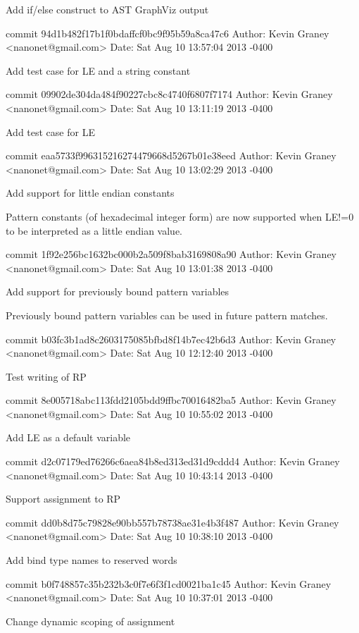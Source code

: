     Add if/else construct to AST GraphViz output

commit 94d1b482f17b1f0bdaffcf0bc9f95b59a8ca47c6
Author: Kevin Graney <nanonet@gmail.com>
Date:   Sat Aug 10 13:57:04 2013 -0400

    Add test case for LE and a string constant

commit 09902de304da484f90227cbc8c4740f6807f7174
Author: Kevin Graney <nanonet@gmail.com>
Date:   Sat Aug 10 13:11:19 2013 -0400

    Add test case for LE

commit eaa5733f996315216274479668d5267b01e38eed
Author: Kevin Graney <nanonet@gmail.com>
Date:   Sat Aug 10 13:02:29 2013 -0400

    Add support for little endian constants
    
    Pattern constants (of hexadecimal integer form) are now supported
    when LE!=0 to be interpreted as a little endian value.

commit 1f92e256bc1632bc000b2a509f8bab3169808a90
Author: Kevin Graney <nanonet@gmail.com>
Date:   Sat Aug 10 13:01:38 2013 -0400

    Add support for previously bound pattern variables
    
    Previously bound pattern variables can be used in future pattern
    matches.

commit b03fc3b1ad8c2603175085bfbd8f14b7ec42b6d3
Author: Kevin Graney <nanonet@gmail.com>
Date:   Sat Aug 10 12:12:40 2013 -0400

    Test writing of RP

commit 8e005718abc113fdd2105bdd9ffbc70016482ba5
Author: Kevin Graney <nanonet@gmail.com>
Date:   Sat Aug 10 10:55:02 2013 -0400

    Add LE as a default variable

commit d2c07179ed76266c6aea84b8ed313ed31d9cddd4
Author: Kevin Graney <nanonet@gmail.com>
Date:   Sat Aug 10 10:43:14 2013 -0400

    Support assignment to RP

commit dd0b8d75c79828e90bb557b78738ae31e4b3f487
Author: Kevin Graney <nanonet@gmail.com>
Date:   Sat Aug 10 10:38:10 2013 -0400

    Add bind type names to reserved words

commit b0f748857c35b232b3c0f7e6f3f1cd0021ba1c45
Author: Kevin Graney <nanonet@gmail.com>
Date:   Sat Aug 10 10:37:01 2013 -0400

    Change dynamic scoping of assignment
    
